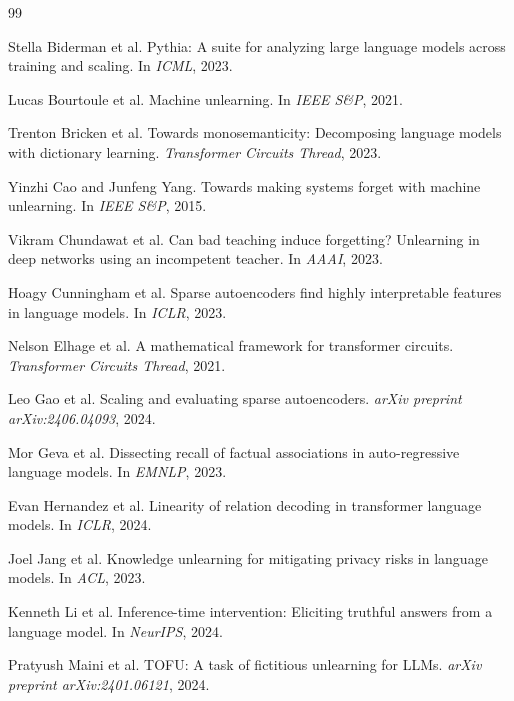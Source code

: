 \documentclass{article}
\begin{document}
\begin{thebibliography}{99}

Stella Biderman et al.
\newblock Pythia: A suite for analyzing large language models across training and scaling.
\newblock In \emph{ICML}, 2023.

Lucas Bourtoule et al.
\newblock Machine unlearning.
\newblock In \emph{IEEE S\&P}, 2021.

Trenton Bricken et al.
\newblock Towards monosemanticity: Decomposing language models with dictionary learning.
\newblock \emph{Transformer Circuits Thread}, 2023.

Yinzhi Cao and Junfeng Yang.
\newblock Towards making systems forget with machine unlearning.
\newblock In \emph{IEEE S\&P}, 2015.

Vikram Chundawat et al.
\newblock Can bad teaching induce forgetting? Unlearning in deep networks using an incompetent teacher.
\newblock In \emph{AAAI}, 2023.

Hoagy Cunningham et al.
\newblock Sparse autoencoders find highly interpretable features in language models.
\newblock In \emph{ICLR}, 2023.

Nelson Elhage et al.
\newblock A mathematical framework for transformer circuits.
\newblock \emph{Transformer Circuits Thread}, 2021.

Leo Gao et al.
\newblock Scaling and evaluating sparse autoencoders.
\newblock \emph{arXiv preprint arXiv:2406.04093}, 2024.

Mor Geva et al.
\newblock Dissecting recall of factual associations in auto-regressive language models.
\newblock In \emph{EMNLP}, 2023.

Evan Hernandez et al.
\newblock Linearity of relation decoding in transformer language models.
\newblock In \emph{ICLR}, 2024.

Joel Jang et al.
\newblock Knowledge unlearning for mitigating privacy risks in language models.
\newblock In \emph{ACL}, 2023.

Kenneth Li et al.
\newblock Inference-time intervention: Eliciting truthful answers from a language model.
\newblock In \emph{NeurIPS}, 2024.

Pratyush Maini et al.
\newblock TOFU: A task of fictitious unlearning for LLMs.
\newblock \emph{arXiv preprint arXiv:2401.06121}, 2024.


\end{thebibliography}
\end{document}
